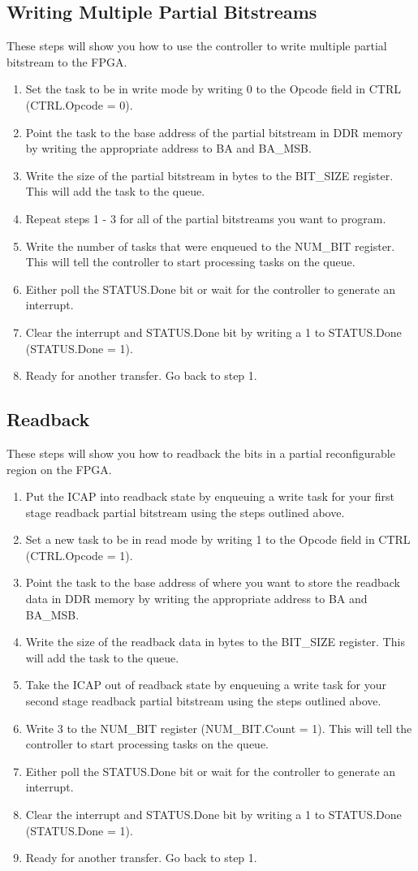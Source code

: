 \documentclass{report}
\begin{document}
\subsection*{Writing Multiple Partial Bitstreams}
These steps will show you how to use the controller to write multiple partial bitstream to the FPGA. 
\begin{enumerate}
	\item Set the task to be in write mode by writing 0 to the Opcode field in CTRL (CTRL.Opcode = 0).
	\item Point the task to the base address of the partial bitstream in DDR memory by writing the appropriate address to BA and BA\_MSB.
	\item Write the size of the partial bitstream in bytes to the BIT\_SIZE register. This will add the task to the queue.
	\item Repeat steps 1 - 3 for all of the partial bitstreams you want to program.
	\item Write the number of tasks that were enqueued to the NUM\_BIT register. This will tell the controller to start processing tasks on the queue.
	\item Either poll the STATUS.Done bit or wait for the controller to generate an interrupt.
	\item Clear the interrupt and STATUS.Done bit by writing a 1 to STATUS.Done (STATUS.Done = 1).
	\item Ready for another transfer. Go back to step 1.
\end{enumerate}
\subsection*{Readback}
These steps will show you how to readback the bits in a partial reconfigurable region on the FPGA. 
\begin{enumerate}
	\item Put the ICAP into readback state by enqueuing a write task for your first stage readback partial bitstream using the steps outlined above.
	\item Set a new task to be in read mode by writing 1 to the Opcode field in CTRL (CTRL.Opcode = 1).
	\item Point the task to the base address of where you want to store the readback data in DDR memory by writing the appropriate address to BA and BA\_MSB.
	\item Write the size of the readback data in bytes to the BIT\_SIZE register. This will add the task to the queue.
	\item Take the ICAP out of readback state by enqueuing a write task for your second stage readback partial bitstream using the steps outlined above.
	\item Write 3 to the NUM\_BIT register (NUM\_BIT.Count = 1). This will tell the controller to start processing tasks on the queue.
	\item Either poll the STATUS.Done bit or wait for the controller to generate an interrupt.
	\item Clear the interrupt and STATUS.Done bit by writing a 1 to STATUS.Done (STATUS.Done = 1).
	\item Ready for another transfer. Go back to step 1.
\end{enumerate}
\end{document}
